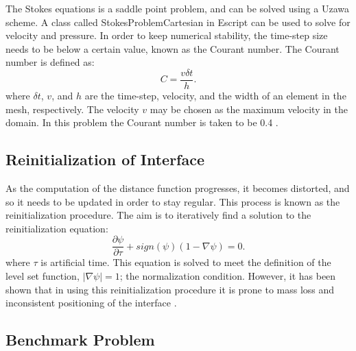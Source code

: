 The Stokes equations is a saddle point problem, and can be solved using a Uzawa scheme. A class called StokesProblemCartesian in Escript can be used to solve for velocity and pressure.
In order to keep numerical stability, the time-step size needs to be below a certain value, known as the Courant number. The Courant number is defined as:
%
\begin{equation}
C = \frac{v \delta t}{h}.
\label{COURANT}
\end{equation}
%
where $\delta t$, $v$, and $h$ are the time-step, velocity, and the width of an element in the mesh, respectively. The velocity $v$ may be chosen as the maximum velocity in the domain. In this problem the Courant number is taken to be 0.4 \cite{BOURGOUIN2006}.


\subsection{Reinitialization of Interface}

As the computation of the distance function progresses, it becomes distorted, and so it needs to be updated in order to stay regular. This process is known as the reinitialization procedure. The aim is to iteratively find a solution to the reinitialization equation:
%
\begin{equation}
\frac{\partial \psi}{\partial \tau} + sign(\psi)(1 - \nabla \psi) = 0.
\label{REINITIALISATION}
\end{equation}
%
where $\tau$ is artificial time. This equation is solved to meet the definition of the level set function, $\lvert \nabla \psi \rvert = 1$; the normalization condition. However, it has been shown that in using this reinitialization procedure it is prone to mass loss and inconsistent positioning of the interface \cite{SUCKALE2008}.


\subsection{Benchmark Problem}

